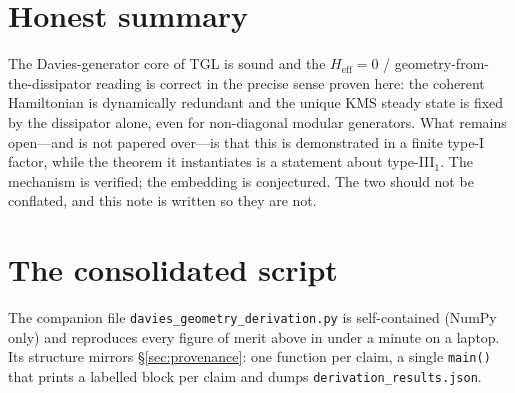 \documentclass[11pt,a4paper]{article}
\theoremstyle{plain}
\theoremstyle{definition}
\newcommand{\Heff}{H_{\mathrm{eff}}}
\newcommand{\code}[1]{\texttt{#1}}
\begin{document}
\section*{Honest summary}
The Davies-generator core of TGL is sound and the $\Heff=0$ / geometry-from-the-dissipator
reading is correct in the precise sense proven here: the coherent Hamiltonian is
dynamically redundant and the unique KMS steady state is fixed by the dissipator
alone, even for non-diagonal modular generators. What remains open---and is not
papered over---is that this is demonstrated in a finite type-I factor, while the
theorem it instantiates is a statement about type-III$_1$. The mechanism is
verified; the embedding is conjectured. The two should not be conflated, and this
note is written so they are not.

\appendix
\section{The consolidated script}\label{app:code}
The companion file \code{davies\_geometry\_derivation.py} is self-contained
(NumPy only) and reproduces every figure of merit above in under a minute on a
laptop. Its structure mirrors \S\ref{sec:provenance}: one function per claim,
a single \code{main()} that prints a labelled block per claim and dumps
\code{derivation\_results.json}.
\end{document}
